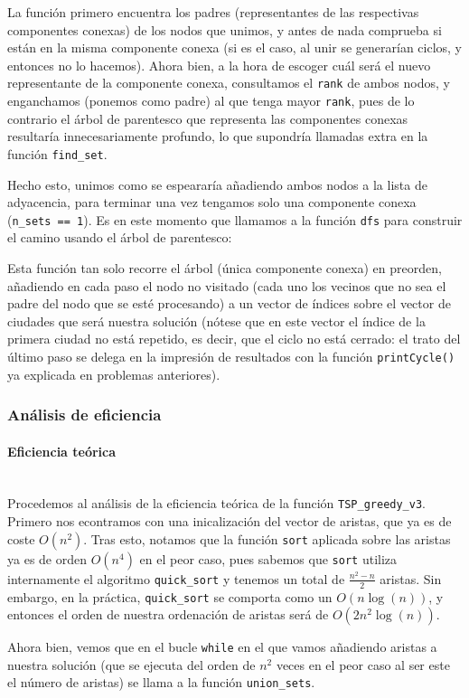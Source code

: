 \documentclass{article}
\newcommand{\myparagraph}[1]{\paragraph{#1}\mbox{}\\}
\begin{document}
 La función primero encuentra los padres (representantes de las
 respectivas componentes conexas) de los nodos que unimos, y
 antes de nada comprueba si están en la misma componente conexa
 (si es el caso, al unir se generarían ciclos, y entonces no lo hacemos). Ahora bien, a la hora de escoger cuál será el nuevo
 representante de la componente conexa, consultamos el \verb |rank| de ambos nodos, y enganchamos (ponemos como padre) al que 
 tenga mayor \verb |rank|, pues de lo contrario el árbol de parentesco que representa las componentes conexas resultaría
 innecesariamente profundo, lo que supondría llamadas
 extra en la función \verb|find_set|.

 Hecho esto, unimos como se espeararía añadiendo ambos
 nodos a la lista de adyacencia, para terminar una vez
 tengamos solo una componente conexa (\verb|n_sets == 1|). Es en este momento que llamamos a la función \verb|dfs| para 
 construir el camino usando el árbol de parentesco:
 
 Esta función tan solo recorre el árbol (única componente conexa) en preorden, añadiendo
 en cada paso el nodo no visitado (cada uno los vecinos que no sea el padre del nodo que se esté procesando) a un vector de índices sobre
 el vector de ciudades que será nuestra solución (nótese que
 en este vector el índice de la primera ciudad no está repetido, es decir, que el ciclo no está cerrado: el trato del último paso se delega en la impresión de resultados 
 con la función \verb|printCycle()| ya explicada en problemas anteriores).
\subsubsection{Análisis de eficiencia}
\myparagraph{Eficiencia teórica}
Procedemos al análisis de la eficiencia teórica de la función
\verb|TSP_greedy_v3|. Primero nos econtramos con una inicalización del vector de aristas, que ya es de coste $O(n^2)$. Tras esto, notamos que la función
\verb|sort| aplicada sobre las aristas ya es de orden $O(n^4)$ en el peor caso, pues sabemos que \verb|sort| utiliza internamente el algoritmo \verb|quick_sort| y tenemos un total de $\frac{n^2-n}{2}$ aristas. Sin embargo, en la práctica,  \verb|quick_sort| se comporta como un $O(n\log(n))$, y entonces el orden
de nuestra ordenación de aristas será de $O(2n^2\log(n))$. 

Ahora bien, vemos que en el bucle \verb|while| en el que vamos
añadiendo aristas a nuestra solución (que se ejecuta del orden de $n^2$ veces en el peor caso al ser este el número de aristas) se llama a la función \verb|union_sets|. 
 
\end{document}
